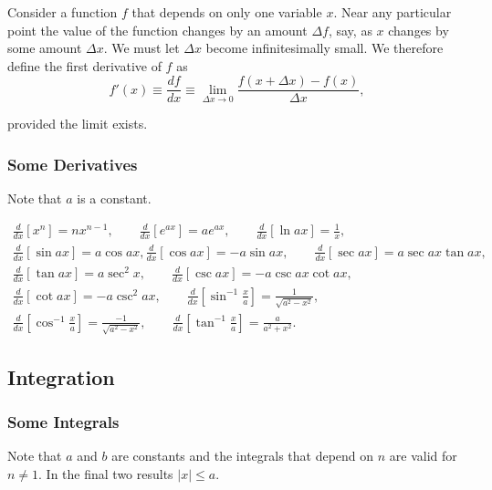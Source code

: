 \documentclass{article}
\begin{document}
Consider a function $f$ that depends on only one variable $x$. Near any particular point the value of the function changes by an amount $\Delta f$, say, as $x$ changes by some amount $\Delta x$. We must let $\Delta x$ become infinitesimally small. We therefore define the first derivative of $f$ as
\begin{equation*}
    f'(x) \equiv \frac{d f}{dx} \equiv \lim\limits_{\Delta x \to 0} \frac{f(x + \Delta x) - f(x)}{\Delta x},
\end{equation*}

provided the limit exists.

\subsubsection{Some Derivatives}

Note that $a$ is a constant.

\begin{gather*}
    \frac{d}{dx} \left[ x^n \right] = nx^{n - 1}, \qquad \frac{d}{dx} \left[ e^{ax} \right] = ae^{ax}, \qquad \frac{d}{dx} \left[ \ln{ax} \right] = \frac{1}{x}, \\
    \frac{d}{dx} \left[ \sin{ax} \right] = a\cos{ax}, \frac{d}{dx} \left[ \cos{ax} \right] = -a\sin{ax}, \qquad \frac{d}{dx} \left[ \sec{ax} \right] = a\sec{ax}\tan{ax}, \\
    \frac{d}{dx} \left[ \tan{ax} \right] = a\sec^2{x}, \qquad \frac{d}{dx} \left[ \csc{ax} \right] = -a\csc{ax}\cot{ax}, \\
    \frac{d}{dx} \left[ \cot{ax} \right] = -a\csc^2{ax}, \qquad \frac{d}{dx} \left[ \sin^{-1}{\frac{x}{a}} \right] = \frac{1}{\sqrt{a^2 - x^2}}, \\
    \frac{d}{dx} \left[ \cos^{-1}{\frac{x}{a}} \right] = \frac{-1}{\sqrt{a^2 - x^2}}, \qquad \frac{d}{dx} \left[ \tan^{-1}{\frac{x}{a}} \right] = \frac{a}{a^2 + x^2}.
\end{gather*}

\subsection{Integration}

\subsubsection{Some Integrals}

Note that $a$ and $b$ are constants and the integrals that depend on $n$ are valid for $n \neq 1$. In the final two results $\left| x \right| \leqslant a$.
\end{document}
